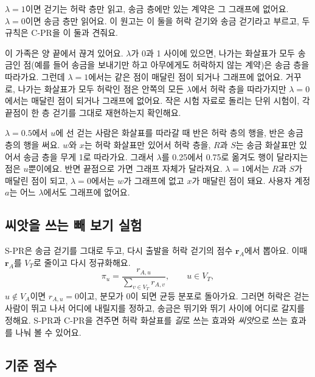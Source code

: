 $\lambda=1$이면 걷기는 허락 층만 읽고, 송금 층에만 있는 계약은 그 그래프에 없어요. $\lambda=0$이면 송금 층만 읽어요. 이 원고는 이 둘을 허락 걷기와 송금 걷기라고 부르고, 두 규칙은 C-PR을 이 둘과 견줘요.

이 가족은 양 끝에서 끊겨 있어요. $\lambda$가 0과 1 사이에 있으면, 나가는 화살표가 모두 송금인 점(예를 들어 송금을 보내기만 하고 아무에게도 허락하지 않는 계약)은 송금 층을 따라가요. 그런데 $\lambda=1$에서는 같은 점이 매달린 점이 되거나 그래프에 없어요. 거꾸로, 나가는 화살표가 모두 허락인 점은 안쪽의 모든 $\lambda$에서 허락 층을 따라가지만 $\lambda=0$에서는 매달린 점이 되거나 그래프에 없어요. 작은 시험 자료로 돌리는 단위 시험이, 각 끝점이 한 층 걷기를 그대로 재현하는지 확인해요.

\begin{puri}
$\lambda=0.5$에서 $u$에 선 걷는 사람은 화살표를 따라갈 때 반은 허락 층의 행을, 반은 송금 층의 행을 써요. $w$와 $x$는 허락 화살표만 있어서 허락 층을, $R$과 $S$는 송금 화살표만 있어서 송금 층을 무게 1로 따라가요. 그래서 $\lambda$를 0.25에서 0.75로 옮겨도 행이 달라지는 점은 $u$뿐이에요. 반면 끝점으로 가면 그래프 자체가 달라져요. $\lambda=1$에서는 $R$과 $S$가 매달린 점이 되고, $\lambda=0$에서는 $w$가 그래프에 없고 $x$가 매달린 점이 돼요. 사용자 계정 $a$는 어느 $\lambda$에서도 그래프에 없어요.
\end{puri}

\subsection{씨앗을 쓰는 빼 보기 실험}

S-PR은 송금 걷기를 그대로 두고, 다시 출발을 허락 걷기의 점수 $\mathbf r_A$에서 뽑아요. 이때 $\mathbf r_A$를 $V_T$로 줄이고 다시 정규화해요.
\begin{equation}
\pi_u=\frac{r_{A,u}}{\sum_{v\in V_T} r_{A,v}},\qquad u\in V_T,
\label{eq:spr}
\end{equation}
$u\notin V_A$이면 $r_{A,u}=0$이고, 분모가 0이 되면 균등 분포로 돌아가요. 그러면 허락은 걷는 사람이 뛰고 나서 어디에 내릴지를 정하고, 송금은 뛰기와 뛰기 사이에 어디로 갈지를 정해요. S-PR과 C-PR을 견주면 허락 화살표를 \emph{길}로 쓰는 효과와 \emph{씨앗}으로 쓰는 효과를 나눠 볼 수 있어요.

\subsection{기준 점수}

